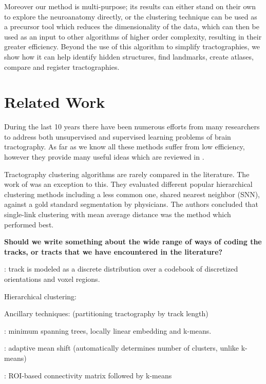 \documentclass[preprint,authoryear,a4paper,10pt,onecolumn]{elsarticle}
\begin{document}
Moreover our method is multi-purpose; its results can either stand on
their own to explore the neuroanatomy directly, or the clustering
technique can be used as a precursor tool which reduces the
dimensionality of the data, which can then be used as an input to other
algorithms of higher order complexity, resulting in their greater
efficiency. Beyond the use of this algorithm to simplify tractographies,
we show how it can help identify hidden structures, find landmarks,
create atlases, compare and register tractographies.

\section{Related Work}

During the last 10 years there have been numerous efforts from many
researchers to address both unsupervised and supervised learning
problems of brain tractography. As far as we know all these methods
suffer from low efficiency, however they provide many useful ideas which
are reviewed in \citet{Garyfallidis_thesis}.

Tractography clustering algorithms are rarely compared in the
literature. The work of \citet{moberts2005evaluation} was
an exception to this. They evaluated different popular hierarchical
clustering methods including a less common one, shared nearest neighbor
(SNN), against a gold standard segmentation by physicians. The authors
concluded that single-link clustering with mean average distance was the
method which performed best. 

\textbf{Should we write something about the wide range of ways of coding the
tracks, or tracts that we have encountered in the literature?}

\citet{wang2010tractography}: track is modeled as a discrete
distribution over a codebook of discretized orientations and voxel
regions. 

Hierarchical clustering: \citep{Visser2010, gerig2004analysis, Guevara2010, zhang2005dti} 


Ancillary techniques: \citet{Guevara2010} (partitioning tractography by track length)

\citet{Tsai2007}: minimum spanning trees, locally linear embedding and k-means.

\citet{zvitia2008adaptive, Zvitia2010}: adaptive mean shift
(automatically determines number of clusters, unlike k-means)

\citet{ElKouby2005}: ROI-based connectivity matrix followed by k-means
\end{document}
